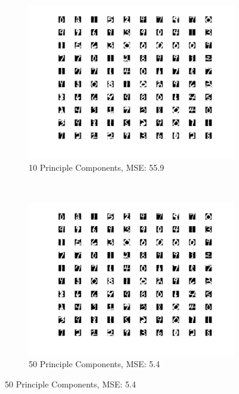 \documentclass{article}
\begin{document}
\begin{figure}[t!]
    \centering
    \begin{subfigure}{0.45\textwidth}
        \centering
        \includegraphics[width=\textwidth]{../pca_100.png}
        \caption{10 Principle Components, MSE: 55.9}
    \end{subfigure}%
    ~
    \begin{subfigure}{0.45\textwidth}
        \centering
        \includegraphics[width=\textwidth]{../pca_200.png}
        \caption{50 Principle Components, MSE: 5.4}
    \end{subfigure}
\end{figure}
\end{document}
